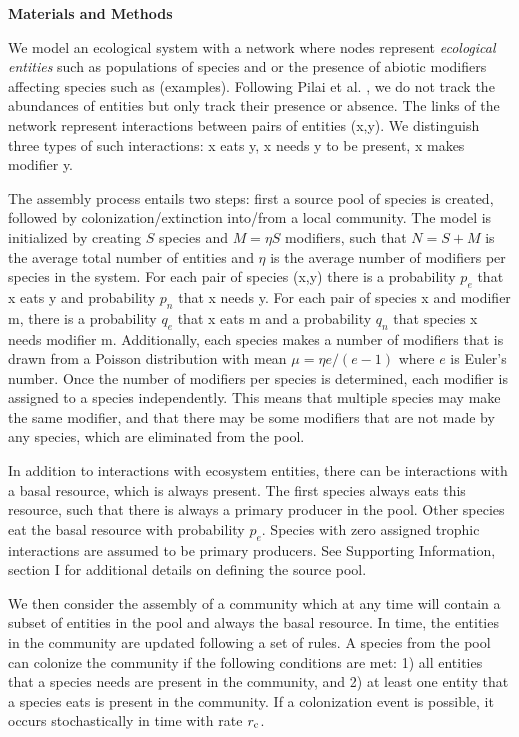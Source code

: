 \documentclass[9pt,twocolumn,twoside]{pnas-new}
\newcommand{\rr}[1]{{\rm #1}}
\begin{document}
\vspace{-2mm}
\noindent \textbf{Materials and Methods}\\
  \footnotesize{
  We model an ecological system with a network where nodes represent \emph{ecological entities} such as populations of species and or the presence of abiotic modifiers affecting species such as (examples).
  Following Pilai et al. \cite{Pillai2011}, we do not track the abundances of entities but only track their presence or absence.
  The links of the network represent interactions between pairs of entities (x,y).
  We distinguish three types of such interactions: x eats y, x needs y to be present, x makes modifier y.

  The assembly process entails two steps: first a source pool of species is created, followed by colonization/extinction into/from a local community.
  The model is initialized by creating $S$ species and $M = \eta S$ modifiers, such that $N=S+M$ is the average total number of entities and $\eta$ is the average number of modifiers per species in the system.
  For each pair of species (x,y) there is a probability $p_e$ that x eats y and probability $p_n$ that x needs y.
  For each pair of species x and modifier m, there is a probability $q_e$ that x eats m and a probability $q_n$ that species x needs modifier m.
  Additionally, each species makes a number of modifiers that is drawn from a Poisson distribution with mean $\mu = \eta e/(e-1)$ where $e$ is Euler's number.
  Once the number of modifiers per species is determined, each modifier is assigned to a species independently.
  This means that multiple species may make the same modifier, and that there may be some modifiers that are not made by any species, which are eliminated from the pool.

  In addition to interactions with ecosystem entities, there can be interactions with a basal resource, which is always present.
  The first species always eats this resource, such that there is always a primary producer in the pool.
  Other species eat the basal resource with probability $p_e$.
  Species with zero assigned trophic interactions are assumed to be primary producers.
  See Supporting Information, section I for additional details on defining the source pool.

  We then consider the assembly of a community which at any time will contain a subset of entities in the pool and always the basal resource.
  In time, the entities in the community are updated following a set of rules.
  A species from the pool can colonize the community if the following conditions are met:
  1) all entities that a species needs are present in the community, and
  2) at least one entity that a species eats is present in the community.
  If a colonization event is possible, it occurs stochastically in time with rate $r_\rr{c}$.

}
\end{document}
